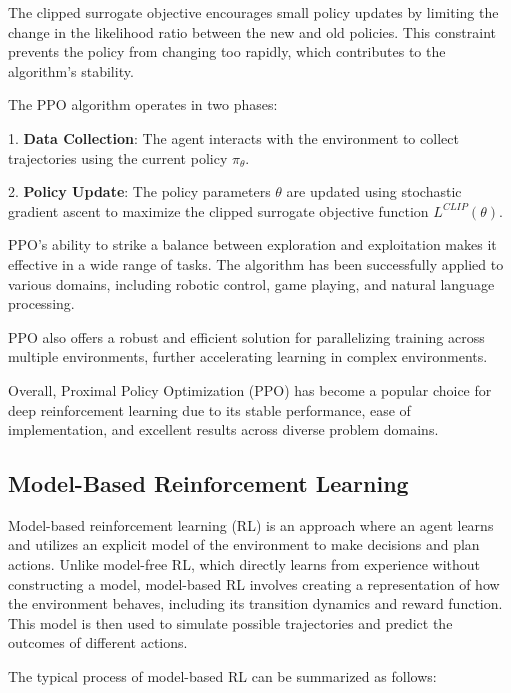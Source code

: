 The clipped surrogate objective encourages small policy updates by limiting the change in the likelihood ratio between the new and old policies. This constraint prevents the policy from changing too rapidly, which contributes to the algorithm's stability.

The PPO algorithm operates in two phases:

1.
\textbf{Data Collection}: The agent interacts with the environment to collect trajectories using the current policy \(\pi_{\theta}\).

2.
\textbf{Policy Update}: The policy parameters \(\theta\) are updated using stochastic gradient ascent to maximize the clipped surrogate objective function \(L^{CLIP}(\theta)\).

PPO's ability to strike a balance between exploration and exploitation makes it effective in a wide range of tasks. The algorithm has been successfully applied to various domains, including robotic control, game playing, and natural language processing.

PPO also offers a robust and efficient solution for parallelizing training across multiple environments, further accelerating learning in complex environments.

Overall, Proximal Policy Optimization (PPO) has become a popular choice for deep reinforcement learning due to its stable performance, ease of implementation, and excellent results across diverse problem domains.

\subsection{Model-Based Reinforcement Learning}



Model-based reinforcement learning (RL) is an approach where an agent learns and utilizes an explicit model of the environment to make decisions and plan actions.
Unlike model-free RL, which directly learns from experience without constructing a model, model-based RL involves creating a representation of how the environment behaves, including its transition dynamics and reward function.
This model is then used to simulate possible trajectories and predict the outcomes of different actions.

The typical process of model-based RL can be summarized as follows:

